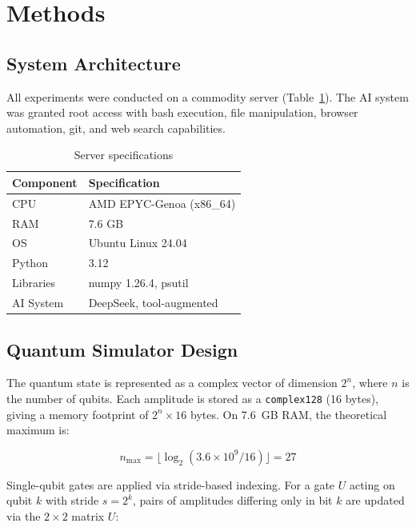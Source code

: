 \documentclass[12pt,a4paper]{article}
\begin{document}

\section{Methods}

\subsection{System Architecture}

All experiments were conducted on a commodity server (Table~\ref{tab:system}). The AI system was granted root access with bash execution, file manipulation, browser automation, git, and web search capabilities.

\begin{table}[H]
\centering
\caption{Server specifications}
\label{tab:system}
\begin{tabular}{ll}
\toprule
\textbf{Component} & \textbf{Specification} \\
\midrule
CPU          & AMD EPYC-Genoa (x86\_64) \\
RAM          & 7.6 GB \\
OS           & Ubuntu Linux 24.04 \\
Python       & 3.12 \\
Libraries    & numpy 1.26.4, psutil \\
AI System    & DeepSeek, tool-augmented \\
\bottomrule
\end{tabular}
\end{table}

\subsection{Quantum Simulator Design}

The quantum state is represented as a complex vector of dimension $2^n$, where $n$ is the number of qubits. Each amplitude is stored as a \texttt{complex128} (16 bytes), giving a memory footprint of $2^n \times 16$ bytes. On 7.6~GB RAM, the theoretical maximum is:

\begin{equation}
n_{\text{max}} = \lfloor \log_2(3.6 \times 10^9 / 16) \rfloor = 27
\end{equation}

Single-qubit gates are applied via stride-based indexing. For a gate $U$ acting on qubit $k$ with stride $s = 2^k$, pairs of amplitudes differing only in bit $k$ are updated via the $2 \times 2$ matrix $U$:
\end{document}
